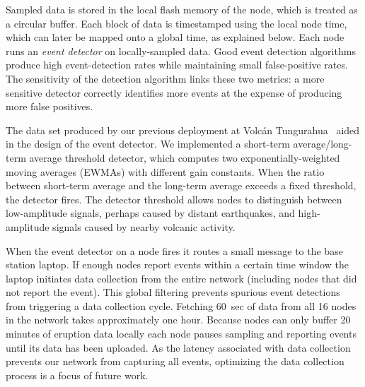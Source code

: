 Sampled data is stored in the local flash memory of the node, which is
treated as a circular buffer. Each block of data is timestamped using
the local node time, which can later be mapped onto a global time,
as explained below. Each node runs an {\em event detector} on 
locally-sampled data. 
Good event detection algorithms produce high
event-detection rates while maintaining small false-positive rates.
The sensitivity of the detection algorithm links these two metrics: a more
sensitive detector correctly identifies more events at the
expense of producing more false positives.  

The data set produced by our previous deployment at Volc\'{a}n
Tungurahua~\cite{volcano-ewsn05} aided in the design of the event detector.
We implemented a short-term average/long-term average threshold detector,
which computes two exponentially-weighted moving averages (EWMAs) with
different gain constants. When the ratio between short-term average and the
long-term average exceeds a fixed threshold, the detector fires.  The
detector threshold allows nodes to distinguish between low-amplitude signals,
perhaps caused by distant earthquakes, and high-amplitude signals caused by
nearby volcanic activity.

When the event detector on a node fires it routes a small message to the base
station laptop.  If enough nodes report events within a certain time window
the laptop initiates data collection from the entire network (including nodes
that did not report the event). This global filtering prevents spurious event
detections from triggering a data collection cycle. Fetching 60~sec of data
from all 16 nodes in the network takes approximately one hour.  Because nodes
can only buffer 20 minutes of eruption data locally each node pauses sampling
and reporting events until its data has been uploaded.  As the latency
associated with data collection prevents our network from capturing all
events, optimizing the data collection process is a focus of future work.


